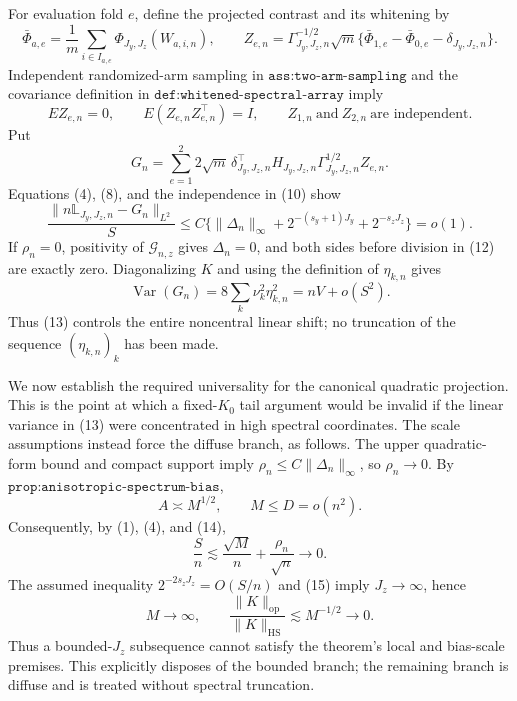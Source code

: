 For evaluation fold \(e\), define the projected contrast and its whitening by
\[
\bar\Phi_{a,e}=\frac1m\sum_{i\in I_{a,e}}\Phi_{J_y,J_z}(W_{a,i,n}),\qquad
Z_{e,n}=\Gamma_{J_y,J_z,n}^{-1/2}\sqrt m\{\bar\Phi_{1,e}-\bar\Phi_{0,e}-\delta_{J_y,J_z,n}\}.
\tag{9}
\]
Independent randomized-arm sampling in \(\texttt{ass:two-arm-sampling}\) and the covariance definition in \(\texttt{def:whitened-spectral-array}\) imply
\[
E Z_{e,n}=0,\qquad E(Z_{e,n}Z_{e,n}^{\top})=I,\qquad Z_{1,n}\ \text{and}\ Z_{2,n}\ \text{are independent}.
\tag{10}
\]
Put
\[
G_n=\sum_{e=1}^2 2\sqrt m\,\delta_{J_y,J_z,n}^{\top}
H_{J_y,J_z,n}\Gamma_{J_y,J_z,n}^{1/2}Z_{e,n}.
\tag{11}
\]
Equations (4), (8), and the independence in (10) show
\[
\frac{\|n\mathbb L_{J_y,J_z,n}-G_n\|_{L^2}}{S}
\le C\{\|\Delta_n\|_\infty+2^{-(s_y+1)J_y}+2^{-s_zJ_z}\}=o(1).
\tag{12}
\]
If \(\rho_n=0\), positivity of \(\mathcal G_{n,z}\) gives \(\Delta_n=0\), and both sides before division in (12) are exactly zero.  Diagonalizing \(K\) and using the definition of \(\eta_{k,n}\) gives
\[
\operatorname{Var}(G_n)=8\sum_k\nu_k^2\eta_{k,n}^2
=nV+o(S^2).
\tag{13}
\]
Thus (13) controls the entire noncentral linear shift; no truncation of the sequence \((\eta_{k,n})_k\) has been made.

We now establish the required universality for the canonical quadratic projection.  This is the point at which a fixed-\(K_0\) tail argument would be invalid if the linear variance in (13) were concentrated in high spectral coordinates.  The scale assumptions instead force the diffuse branch, as follows.  The upper quadratic-form bound and compact support imply \(\rho_n\le C\|\Delta_n\|_\infty\), so \(\rho_n\to0\).  By \(\texttt{prop:anisotropic-spectrum-bias}\),
\[
A\asymp M^{1/2},\qquad M\le D=o(n^2).
\tag{14}
\]
Consequently, by (1), (4), and (14),
\[
\frac Sn\lesssim \frac{\sqrt M}{n}+\frac{\rho_n}{\sqrt n}\longrightarrow0.
\tag{15}
\]
The assumed inequality \(2^{-2s_zJ_z}=O(S/n)\) and (15) imply \(J_z\to\infty\), hence
\[
M\longrightarrow\infty,\qquad
\frac{\|K\|_{\mathrm{op}}}{\|K\|_{\mathrm{HS}}}\lesssim M^{-1/2}\longrightarrow0.
\tag{16}
\]
Thus a bounded-\(J_z\) subsequence cannot satisfy the theorem's local and bias-scale premises.  This explicitly disposes of the bounded branch; the remaining branch is diffuse and is treated without spectral truncation.

